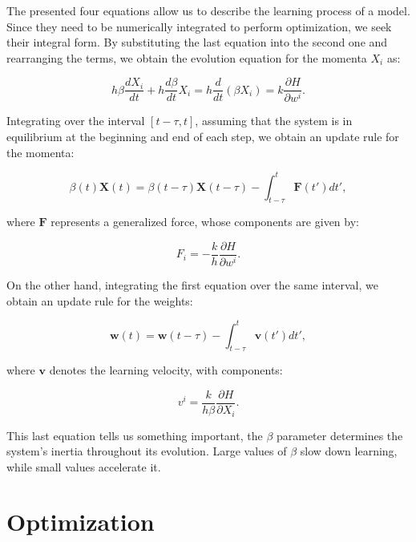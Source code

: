 \documentclass[12pt]{article}
\begin{document}
The presented four equations allow us to describe the learning process of a model. Since they need to be numerically integrated to perform optimization, we seek their integral form. By substituting the last equation into the second one and rearranging the terms, we obtain the evolution equation for the momenta $X_i$ as:

\begin{equation}
h\beta \frac{dX_{i}}{dt} + h\frac{d\beta}{dt} X_{i} = h \frac{d}{dt}(\beta X_{i}) = k\frac{\partial H}{\partial w^{i}}.
\end{equation}

Integrating over the interval $[t-\tau,t]$, assuming that the system is in equilibrium at the beginning and end of each step, we obtain an update rule for the momenta:

\begin{equation}
\beta(t) \mathbf{X}(t) = \beta(t-\tau) \mathbf{X}(t-\tau) -\int_{t-\tau}^{t} \mathbf{F}(t') dt',
\end{equation}

where $\mathbf{F}$ represents a generalized force, whose components are given by:

\begin{equation}
F_{i} = -\frac{k}{h}\frac{\partial H}{\partial w^{i}}.
\end{equation}

On the other hand, integrating the first equation over the same interval, we obtain an update rule for the weights:

\begin{equation}
\mathbf{w}(t) = \mathbf{w}(t-\tau) - \int_{t-\tau}^t \mathbf{v}(t')dt',
\end{equation}

where $\mathbf{v}$ denotes the learning velocity, with components:

\begin{equation}
v^{i} = \frac{k}{h\beta} \frac{\partial H}{\partial X_{i}}.
\end{equation}

This last equation tells us something important, the $\beta$ parameter determines the system's inertia throughout its evolution. Large values of $\beta$ slow down learning, while small values accelerate it.

\section*{Optimization}
\end{document}
